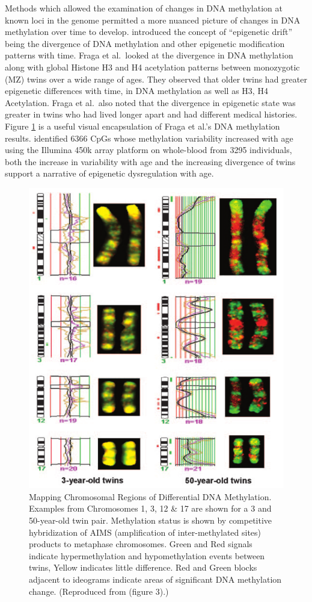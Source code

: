 \documentclass[
]{book}
\begin{document}
Methods which allowed the examination of changes in DNA methylation at known loci in the genome permitted a more nuanced picture of changes in DNA methylation over time to develop. \citet{Fraga2005} introduced the concept of ``epigenetic drift'' being the divergence of DNA methylation and other epigenetic modification patterns with time. Fraga et al.~looked at the divergence in DNA methylation along with global Histone H3 and H4 acetylation patterns between monozygotic (MZ) twins over a wide range of ages. They observed that older twins had greater epigenetic differences with time, in DNA methylation as well as H3, H4 Acetylation. Fraga et al.~also noted that the divergence in epigenetic state was greater in twins who had lived longer apart and had different medical histories. Figure \ref{fig:Fraga2005fig3} is a useful visual encapsulation of Fraga et al.'s DNA methylation results. \citet{Slieker2016} identified 6366 CpGs whose methylation variability increased with age using the Illumina 450k array platform on whole-blood from 3295 individuals, both the increase in variability with age and the increasing divergence of twins support a narrative of epigenetic dysregulation with age.

\begin{figure}
\includegraphics[width=0.8\linewidth]{figs/Fraga2005fig3} \caption{Mapping Chromosomal Regions of Differential DNA Methylation.
Examples from Chromosomes 1, 3, 12 \& 17 are shown for a 3 and 50-year-old twin pair.
Methylation status is shown by competitive hybridization of AIMS (amplification of inter-methylated sites) products to metaphase chromosomes.
Green and Red signals indicate hypermethylation and hypomethylation events between twins, Yellow indicates little difference.
Red and Green blocks adjacent to ideograms indicate areas of significant DNA methylation change.
(Reproduced from \citep{Fraga2005} (figure 3).)}\label{fig:Fraga2005fig3}
\end{figure}
\end{document}
